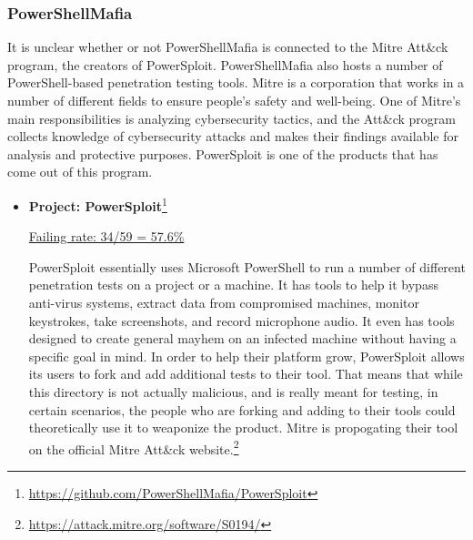 \documentclass[]{acmart}
\begin{document}
\subsubsection{PowerShellMafia}
It is unclear whether or not PowerShellMafia is connected to the Mitre Att\&ck program, the creators of PowerSploit. PowerShellMafia also hosts a number of PowerShell-based penetration testing tools. Mitre is a corporation that works in a number of different fields to ensure people's safety and well-being. One of Mitre's main responsibilities is analyzing cybersecurity tactics, and the Att\&ck program collects knowledge of cybersecurity attacks and makes their findings available for analysis and protective purposes. PowerSploit is one of the products that has come out of this program.
\begin{itemize}
    \item { \bf Project: PowerSploit}\footnote{{\url{https://github.com/PowerShellMafia/PowerSploit}}}
    
    \underline{ Failing rate: 34/59 = 57.6\% }

    PowerSploit essentially uses Microsoft PowerShell to run a number of different penetration tests on a project or a machine. It has tools to help it bypass anti-virus systems, extract data from compromised machines, monitor keystrokes, take screenshots, and record microphone audio. It even has tools designed to create general mayhem on an infected machine without having a specific goal in mind. In order to help their platform grow, PowerSploit allows its users to fork and add additional tests to their tool. That means that while this directory is not actually malicious, and is really meant for testing, in certain scenarios, the people who are forking and adding to their tools could theoretically use it to weaponize the product. Mitre is propogating their tool on the official Mitre Att\&ck website.\footnote{\url{https://attack.mitre.org/software/S0194/}}
\end{itemize}
\end{document}
